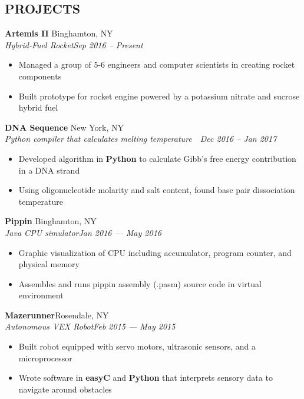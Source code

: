 \documentclass[10pt]{article}
\begin{document}
\subsection*{PROJECTS}
\spacedhrule{-0.1em}{0.5em}

\textbf{Artemis II} \hfill Binghamton, NY \\
\textit{Hybrid-Fuel Rocket}\hfill \textit{Sep 2016 – Present}
\begin{itemize}
	\item Managed a group of 5-6 engineers and computer scientists in creating rocket components
	\item Built prototype for rocket engine powered by a potassium nitrate and sucrose hybrid fuel
\end{itemize}
\ssubsecspace
\textbf{DNA Sequence} \hfill New York, NY \\
\textit{Python compiler that calculates melting temperature}  \hfill \textit{Dec 2016 – Jan 2017}                             
\begin{itemize}
	\item Developed algorithm in \textbf{Python} to calculate Gibb's free energy contribution in a DNA strand
	\item Using oligonucleotide molarity and salt content, found base pair dissociation temperature
\end{itemize}
\ssubsecspace
\textbf{Pippin} \hfill Binghamton, NY \\
\textit{Java CPU simulator}\hfill \textit{Jan 2016 — May 2016}                           
\begin{itemize}
	\item Graphic visualization of CPU including accumulator, program counter, and physical memory
	\item Assembles and runs pippin assembly (.pasm) source code in virtual environment
\end{itemize}
\ssubsecspace
\textbf{Mazerunner}\hfill  Rosendale, NY    \\
\textit{Autonomous VEX Robot}\hfill \textit{Feb 2015 — May 2015}
\begin{itemize}
	\item Built robot equipped with servo motors, ultrasonic sensors, and a microprocessor
	\item Wrote software in \textbf{easyC} and \textbf{Python} that interprets sensory data to navigate around obstacles
\end{itemize}
\end{document}

